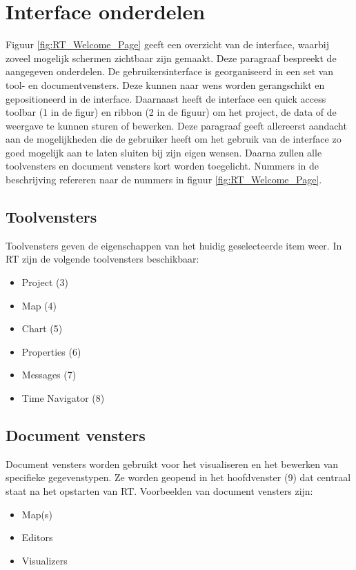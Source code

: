 \section{Interface onderdelen}
	\label{sec:DS:InterfaceOnderdelen}
Figuur \ref{fig:RT_Welcome_Page} geeft een overzicht van de interface, waarbij zoveel mogelijk schermen zichtbaar zijn gemaakt. Deze paragraaf bespreekt de aangegeven onderdelen. De gebruikersinterface is georganiseerd in een set van tool- en documentvensters. Deze kunnen naar wens worden gerangschikt en gepositioneerd in de interface. Daarnaast heeft de interface een quick access toolbar (1 in de figur) en ribbon (2 in de figuur) om het project, de data of de weergave te kunnen sturen of bewerken. Deze paragraaf geeft allereerst aandacht aan de mogelijkheden die de gebruiker heeft om het gebruik van de interface zo goed mogelijk aan te laten sluiten bij zijn eigen wensen. Daarna zullen alle toolvensters en document vensters kort worden toegelicht. Nummers in de beschrijving refereren naar de nummers in figuur \ref{fig:RT_Welcome_Page}.

\subsection*{Toolvensters}
Toolvensters geven de eigenschappen van het huidig geselecteerde item weer. In RT zijn de volgende toolvensters beschikbaar:
\begin{itemize}
\item Project (3)
\item Map (4)
\item Chart (5)
\item Properties (6)
\item Messages (7)
\item Time Navigator (8)
\end{itemize}

\subsection*{Document vensters}
Document vensters worden gebruikt voor het visualiseren en het bewerken van specifieke gegevenstypen. Ze worden geopend in het hoofdvenster (9) dat centraal staat na het opstarten van RT. Voorbeelden van document vensters zijn:
\begin{itemize}
\item Map(s)
\item Editors
\item Visualizers
\end{itemize}

